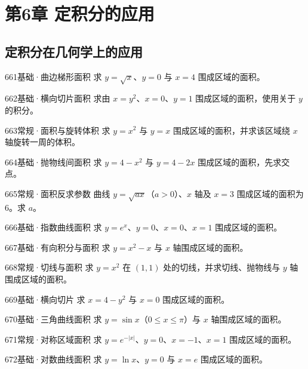 \section{第6章 定积分的应用}
\subsection{定积分在几何学上的应用}
\begin{exercise}{661}{基础·曲边梯形面积}
求 $y=\sqrt x$、$y=0$ 与 $x=4$ 围成区域的面积。
\end{exercise}
\begin{exercise}{662}{基础·横向切片面积}
求由 $x=y^2$、$x=0$、$y=1$ 围成区域的面积，使用关于 $y$ 的积分。
\end{exercise}
\begin{exercise}{663}{常规·面积与旋转体积}
求 $y=x^2$ 与 $y=x$ 围成区域的面积，并求该区域绕 $x$ 轴旋转一周的体积。
\end{exercise}
\begin{exercise}{664}{基础·抛物线间面积}
求 $y=4-x^2$ 与 $y=4-2x$ 围成区域的面积，先求交点。
\end{exercise}
\begin{exercise}{665}{常规·面积反求参数}
曲线 $y=\sqrt{ax}$（$a>0$）、$x$ 轴及 $x=3$ 围成区域的面积为 $6$。求 $a$。
\end{exercise}
\begin{exercise}{666}{基础·指数曲线面积}
求 $y=e^x$、$y=0$、$x=0$、$x=1$ 围成区域的面积。
\end{exercise}
\begin{exercise}{667}{基础·有向积分与面积}
求 $y=x^2-x$ 与 $x$ 轴围成区域的面积。
\end{exercise}
\begin{exercise}{668}{常规·切线与面积}
求 $y=x^2$ 在 $(1,1)$ 处的切线，并求切线、抛物线与 $y$ 轴围成区域的面积。
\end{exercise}
\begin{exercise}{669}{基础·横向切片}
求 $x=4-y^2$ 与 $x=0$ 围成区域的面积。
\end{exercise}
\begin{exercise}{670}{基础·三角曲线面积}
求 $y=\sin x$（$0\le x\le\pi$）与 $x$ 轴围成区域的面积。
\end{exercise}
\begin{exercise}{671}{常规·对称区域面积}
求 $y=e^{-|x|}$、$y=0$、$x=-1$、$x=1$ 围成区域的面积。
\end{exercise}
\begin{exercise}{672}{基础·对数曲线面积}
求 $y=\ln x$、$y=0$ 与 $x=e$ 围成区域的面积。
\end{exercise}

